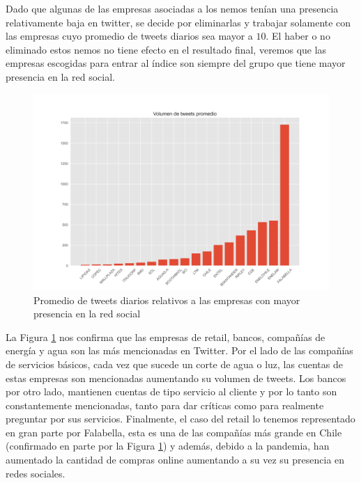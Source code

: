 \documentclass{article}
\begin{document}
\begin{remark}
Dado que algunas de las empresas asociadas a los nemos tenían una presencia relativamente baja en twitter, se decide por eliminarlas y trabajar solamente con las empresas cuyo promedio de tweets diarios sea mayor a $10$. El haber o no eliminado estos nemos no tiene efecto en el resultado final, veremos que las empresas escogidas para entrar al índice son siempre del grupo que tiene mayor presencia en la red social.
\end{remark}
\begin{figure}[H]
	\centering
	\includegraphics[scale=.38]{imgs/volume_tweets_agg.png}
	\caption{Promedio de tweets diarios relativos a las empresas con mayor presencia en la red social}
	\label{fig:volume_tweets_agg}
\end{figure}
La Figura \ref{fig:volume_tweets_agg} nos confirma que las empresas de retail, bancos, compañías de energía y agua son las más mencionadas en Twitter. Por el lado de las compañías de servicios básicos, cada vez que sucede un corte de agua o luz, las cuentas de estas empresas son mencionadas aumentando su volumen de tweets. Los bancos por otro lado, mantienen cuentas de tipo servicio al cliente y por lo tanto son constantemente mencionadas, tanto para dar críticas como para realmente preguntar por sus servicios. Finalmente, el caso del retail lo tenemos representado en gran parte por Falabella, esta es una de las compañías más grande en Chile (confirmado en parte por la Figura \ref{fig:volume_tweets_agg}) y además, debido a la pandemia, han aumentado la cantidad de compras online aumentando a su vez su presencia en redes sociales.
\end{document}
